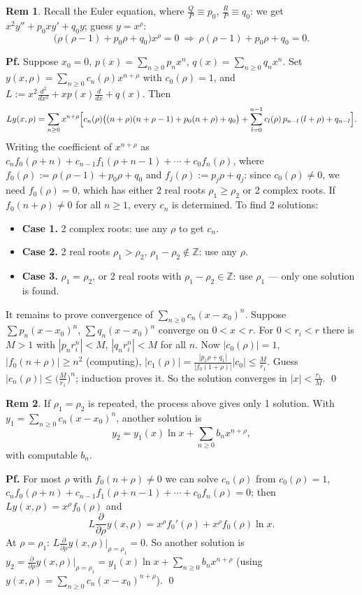 \documentclass[11pt]{article}
\theoremstyle{definition}
\newtheorem*{remark}{Rem}
\theoremstyle{remark}
\newcommand{\Z}{\mathbb{Z}}
\begin{document}
\begin{remark}
Recall the Euler equation, where $\frac{Q}{P}\equiv p_0$, $\frac{R}{P}\equiv q_0$: we get
$x^2y''+p_0xy'+q_0y$; guess $y=x^{\rho}$:
\[
\bigl(\rho(\rho-1)+p_0\rho+q_0\bigr)x^{\rho}=0
\ \Rightarrow\ \rho(\rho-1)+p_0\rho+q_0=0.
\]
\end{remark}

\textbf{Pf.} Suppose $x_0=0$, $p(x)=\sum_{n\ge0}p_nx^n$, $q(x)=\sum_{n\ge0}q_nx^n$. Set
$y(x,\rho)=\sum_{n\ge0}c_n(\rho)x^{n+\rho}$ with $c_0(\rho)=1$, and
$L:=x^2\frac{d^2}{dx^2}+xp(x)\frac{d}{dx}+q(x)$. Then
\[
Ly(x,\rho)=\sum_{n\ge0}x^{n+\rho}\Bigl[c_n(\rho)\bigl((n+\rho)(n+\rho-1)+p_0(n+\rho)+q_0\bigr)+\sum_{l=0}^{n-1}c_l(\rho)\,p_{n-l}\,(l+\rho)+q_{n-l}\Bigr].
\]
Writing the coefficient of $x^{n+\rho}$ as $c_nf_0(\rho+n)+c_{n-1}f_1(\rho+n-1)+\cdots+c_0f_n(\rho)$,
where $f_0(\rho):=\rho(\rho-1)+p_0\rho+q_0$ and $f_j(\rho):=p_j\rho+q_j$:
since $c_0(\rho)\neq0$, we need $f_0(\rho)=0$, which has either 2 real roots $\rho_1\ge\rho_2$ or 2
complex roots. If $f_0(n+\rho)\neq0$ for all $n\ge1$, every $c_n$ is determined. To find 2 solutions:
\begin{itemize}
\item \textbf{Case 1.} 2 complex roots: use any $\rho$ to get $c_n$.
\item \textbf{Case 2.} 2 real roots $\rho_1>\rho_2$, $\rho_1-\rho_2\notin\Z$: use any $\rho$.
\item \textbf{Case 3.} $\rho_1=\rho_2$, or 2 real roots with $\rho_1-\rho_2\in\Z$: use $\rho_1$ --- only one solution is found.
\end{itemize}
It remains to prove convergence of $\sum_{n\ge0}c_n(x-x_0)^n$. Suppose
$\sum p_n(x-x_0)^n$, $\sum q_n(x-x_0)^n$ converge on $0<x<r$. For $0<r_i<r$ there is $M>1$ with
$|p_nr_i^n|<M$, $|q_nr_i^n|<M$ for all $n$. Now $|c_0(\rho)|=1$, $|f_0(n+\rho)|\ge n^2$ (computing),
$|c_1(\rho)|=\frac{|p_1\rho+q_1|}{|f_0(1+\rho)|}|c_0|\le\frac{M}{r_1}$. Guess
$|c_n(\rho)|\le\bigl(\frac{M}{r_1}\bigr)^n$; induction proves it. So the solution converges in
$|x|<\frac{r_1}{M}$. \qed

\begin{remark}
If $\rho_1=\rho_2$ is repeated, the process above gives only 1 solution. With
$y_1=\sum_{n\ge0}c_n(x-x_0)^n$, another solution is
\[
y_2=y_1(x)\ln x+\sum_{n\ge0}b_nx^{n+\rho},
\]
with computable $b_n$.

\textbf{Pf.} For most $\rho$ with $f_0(n+\rho)\neq0$ we can solve $c_n(\rho)$ from
$c_0(\rho)=1$, $c_nf_0(\rho+n)+c_{n-1}f_1(\rho+n-1)+\cdots+c_0f_n(\rho)=0$; then
$Ly(x,\rho)=x^{\rho}f_0(\rho)$ and
\[
L\frac{\partial}{\partial\rho}y(x,\rho)=x^{\rho}f_0'(\rho)+x^{\rho}f_0(\rho)\ln x.
\]
At $\rho=\rho_1$: $L\frac{\partial}{\partial\rho}y(x,\rho)\big|_{\rho=\rho_1}=0$. So another solution is
$y_2=\frac{\partial}{\partial\rho}y(x,\rho)\big|_{\rho=\rho_1}=y_1(x)\ln x+\sum_{n\ge0}b_nx^{n+\rho}$
(using $y(x,\rho)=\sum_{n\ge0}c_n(x-x_0)^{n+\rho}$). \qed
\end{remark}
\end{document}
